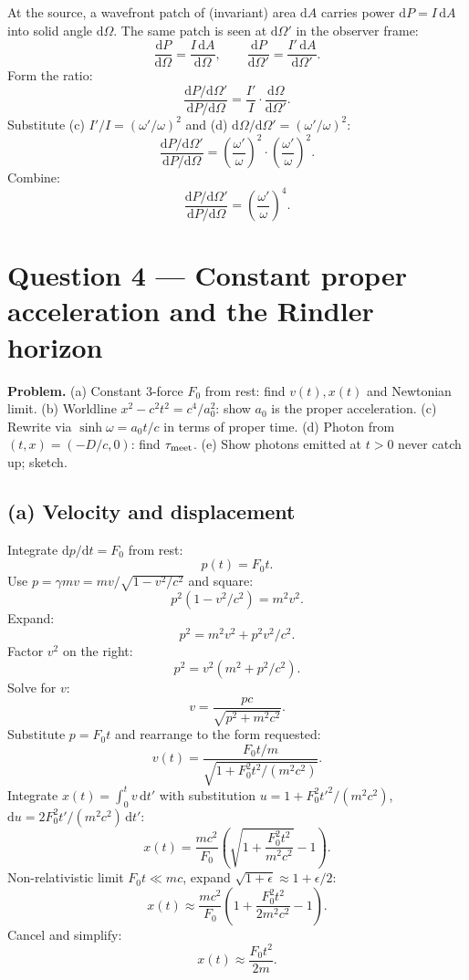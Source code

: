 \documentclass[11pt]{article}
\newcommand{\de}{\mathrm{d}}
\begin{document}
At the source, a wavefront patch of (invariant) area $\de A$ carries power $\de P=I\,\de A$ into solid angle $\de\Omega$. The same patch is seen at $\de\Omega'$ in the observer frame:
\[ \frac{\de P}{\de\Omega}=\frac{I\,\de A}{\de\Omega},\qquad\frac{\de P}{\de\Omega'}=\frac{I'\,\de A}{\de\Omega'}. \]
Form the ratio:
\[ \frac{\de P/\de\Omega'}{\de P/\de\Omega}=\frac{I'}{I}\cdot\frac{\de\Omega}{\de\Omega'}. \]
Substitute (c) $I'/I=(\omega'/\omega)^2$ and (d) $\de\Omega/\de\Omega'=(\omega'/\omega)^2$:
\[ \frac{\de P/\de\Omega'}{\de P/\de\Omega}=\left(\frac{\omega'}{\omega}\right)^{\!2}\cdot\left(\frac{\omega'}{\omega}\right)^{\!2}. \]
Combine:
\begin{equation}
\boxed{\,\frac{\de P/\de\Omega'}{\de P/\de\Omega}=\left(\frac{\omega'}{\omega}\right)^{\!4}.\,}
\end{equation}

\section*{Question 4 --- Constant proper acceleration and the Rindler horizon}

\textbf{Problem.} (a) Constant 3-force $F_0$ from rest: find $v(t),x(t)$ and Newtonian limit. (b) Worldline $x^2-c^2t^2=c^4/a_0^2$: show $a_0$ is the proper acceleration. (c) Rewrite via $\sinh\omega=a_0t/c$ in terms of proper time. (d) Photon from $(t,x)=(-D/c,0)$: find $\tau_{\rm meet}$. (e) Show photons emitted at $t>0$ never catch up; sketch.

\subsection*{(a) Velocity and displacement}

Integrate $\de p/\de t=F_0$ from rest:
\[ p(t)=F_0 t. \]
Use $p=\gamma mv=mv/\sqrt{1-v^2/c^2}$ and square:
\[ p^2(1-v^2/c^2)=m^2v^2. \]
Expand:
\[ p^2=m^2v^2+p^2v^2/c^2. \]
Factor $v^2$ on the right:
\[ p^2=v^2(m^2+p^2/c^2). \]
Solve for $v$:
\[ v=\frac{pc}{\sqrt{p^2+m^2c^2}}. \]
Substitute $p=F_0t$ and rearrange to the form requested:
\begin{equation}
\boxed{\,v(t)=\frac{F_0t/m}{\sqrt{1+F_0^2t^2/(m^2c^2)}}.\,}
\end{equation}
Integrate $x(t)=\int_0^t v\,\de t'$ with substitution $u=1+F_0^2 t'^2/(m^2c^2)$, $\de u=2F_0^2 t'/(m^2c^2)\,\de t'$:
\begin{equation}
\boxed{\,x(t)=\frac{mc^2}{F_0}\!\left(\sqrt{1+\frac{F_0^2t^2}{m^2c^2}}-1\right).\,}
\end{equation}
Non-relativistic limit $F_0t\ll mc$, expand $\sqrt{1+\epsilon}\approx 1+\epsilon/2$:
\[ x(t)\approx\frac{mc^2}{F_0}\!\left(1+\frac{F_0^2t^2}{2m^2c^2}-1\right). \]
Cancel and simplify:
\[ x(t)\approx\frac{F_0t^2}{2m}. \]
\end{document}
